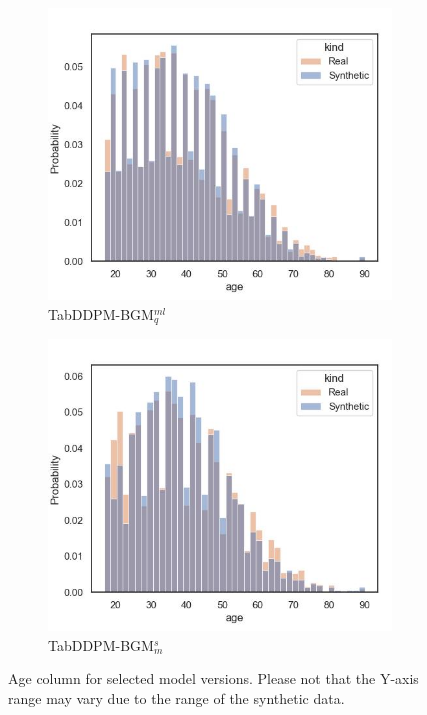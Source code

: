 \begin{figure}[h]
\begin{subfigure}{0.23\textwidth}
		\includegraphics[width=\textwidth]{images/dist_age/tab-ddpm-bgm.jpg}
		\caption{TabDDPM-BGM$^{ml}_q$}
	\end{subfigure}
	\begin{subfigure}{0.23\textwidth}
		\centering
		\includegraphics[width=\textwidth]{images/dist_age/tab-ddpm-bgm-simTune-minmax.jpg}
		\caption{TabDDPM-BGM$^{s}_m$}
	\end{subfigure}
	\caption{Age column for selected model versions. Please not that the Y-axis range may vary due to the range of the synthetic data.}
	\label{fig:age}
\end{figure}

